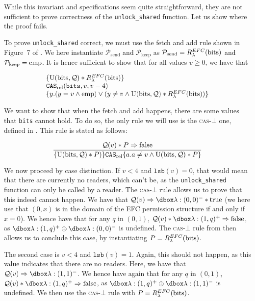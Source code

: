 While this invariant and specifications seem quite straightforward, they are not sufficient to prove correctness of the \texttt{unlock\_shared} function. Let us show where the proof fails.

To prove \texttt{unlock\_shared} correct, we must use the fetch and add rule shown in Figure~7 of \cite{fsl}. We here instantiate $\mathcal{P}_{\text{send}}$ and $\mathcal{P}_{\text{keep}}$ as $\mathcal{P}_{\text{send}} = R_{\lambda}^{EFC}(\text{bits})$ and $\mathcal{P}_{\text{keep}} = \mathrm{emp}$. It is hence sufficient to show that for all values  $v \geq 0$, we have that 

\[
\begin{array}{l}
\{\text{U}(\text {bits}, \mathcal{Q}) * R_{\lambda}^{EFC}(\text{bits})\} \\
\texttt{CAS}_{\text{rel}}(\texttt{bits}, v, v - 4) \\
\{y. (y = v \land \mathrm{emp}) \lor (y \neq v \land \text{U}(\text {bits}, \mathcal{Q}) * R_{\lambda}^{EFC}(\text{bits}))\}
\end{array}\]

We want to show that when the fetch and add happens, there are some values that \texttt{bits} cannot hold. To do so, the only rule we will use is the \textsc{cas}-$\bot$ one, defined in \cite{fsl}. This rule is stated as follows:

\[
		\frac{\mathcal{Q}(v) * P \Rightarrow \mathrm{false}}{\{\text{U}(\text {bits}, \mathcal{Q}) * P)\} \mathtt{CAS}_{\text{rel}} \{a. a \neq v \land \text{U}(\text {bits}, \mathcal{Q}) * P\}}
\]


We now proceed by case distinction.
If $v < 4$ and $\texttt{lsb}(v) = 0$, that would mean that there are currently no readers, which can't be, as the \texttt{unlock\_shared} function can only be called by a reader. The \textsc{cas}-$\bot$ rule allows us to prove that this indeed cannot happen. We have that $\mathcal{Q}(v) \Rightarrow \efcm{0}{0} * \text{true}$ (we here use that $(0, x)$ is in the domain of the EFC permission structure if and only if $x = 0$). We hence have that for any $q$ in $(0, 1)$, $\mathcal{Q}(v) * \efcp{1}{q} \Rightarrow \text{false}$, as $\efcp{1}{q} \oplus \efcm{0}{0}$ is undefined. The \textsc{cas}-$\bot$ rule from \cite{fsl} then allows us to conclude this case, by instantiating $P = R_{\lambda}^{EFC}(\text{bits})$.

The second case is $v < 4$ and $\texttt{lsb}(v) = 1$. Again, this should not happen, as this value indicates that there are no readers. Here, we have that $\mathcal{Q}(v) \Rightarrow \efcm{1}{1}$. We hence have again that for any $q$ in $(0, 1)$,  $\mathcal{Q}(v) * \efcp{1}{q} \Rightarrow \text{false}$, as $\efcp{1}{q} \oplus \efcm{1}{1}$ is undefined. We then use the \textsc{cas}-$\bot$ rule with $P = R_{\lambda}^{EFC}(\text{bits})$.

